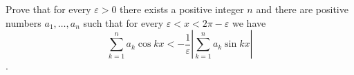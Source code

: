 Prove that for every $\varepsilon >0$ there exists a positive integer $n$ and there are positive numbers $a_1, \ldots, a_n$ such that for every $\varepsilon < x < 2\pi - \varepsilon$ we have
$$\sum_{k=1}^n a_k\cos kx < -\frac{1}{\varepsilon}\left| \sum_{k=1}^n a_k\sin kx\right|$$.